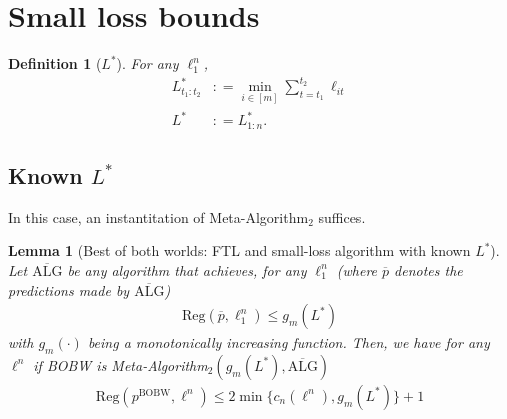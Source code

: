 \documentclass[11pt,letter]{article}
\newtheorem{definition}{Definition}
\newtheorem{lemma}{Lemma}
\newcommand{\defeq}{\mathrel{\mathop{:}}=}
\newcommand{\Reg}{\mathrm{Reg}}
\newcommand{\pwc}{\overline{p}}
\newcommand{\wcalg}{\overline{\text{ALG}}}
\newcommand{\pbobw}{p^{\mathrm{BOBW}}}
\begin{document}
\section{Small loss bounds}
\begin{definition}[$L^*$] \label{def:Lstar}
For any $\ell_1^n$, 
    \begin{align}
        L^*_{t_1:t_2} &\defeq \min_{i \in [m]} \sum_{t=t_1}^{t_2} \ell_{it} \label{eq:LstarBtwnTs} \\
        L^* &\defeq L^*_{1:n} \label{eq:LStarn}.
    \end{align}
\end{definition}
\subsection{Known $L^*$} 
In this case, an instantitation of Meta-Algorithm$_2$ suffices. 

\begin{lemma}[Best of both worlds: FTL and small-loss algorithm with known $L^*$]\label{lem:BOBWKnownLStar}
    Let $\wcalg$ be any algorithm that achieves, for any $\ell_1^n$ (where $\pwc$ denotes the predictions made by $\wcalg$) 
    \begin{align}\label{eq:LStarAlgRegUB}
    \Reg(\pwc, \ell_1^n) \le g_m(L^*)
    \end{align}
    with $g_m(\cdot)$ being a monotonically increasing function. Then, we have for any $\ell^n$ if BOBW is Meta-Algorithm$_2(g_m(L^*),\wcalg)$
    \begin{align}\label{eq:RegBOBWKnownLstar}
        \Reg(\pbobw, \ell^n) \le 2\min\{c_n(\ell^n), g_m(L^*)\} + 1
    \end{align}
\end{lemma}
\end{document}
